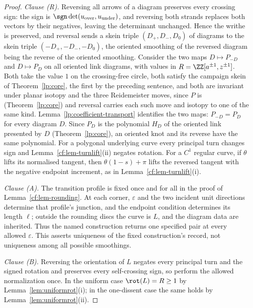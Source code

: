 \begin{proof}\leanok{}
\emph{Clause (R).}
Reversing all arrows of a diagram preserves every crossing sign: the sign
is $\sgn\det(u_{\mathrm{over}},u_{\mathrm{under}})$, and reversing both
strands replaces both vectors by their negatives, leaving the determinant
unchanged. Hence the writhe is preserved, and reversal sends a skein triple
$(D_+,D_-,D_0)$ of diagrams to the skein triple $(-D_+,-D_-,-D_0)$, the
oriented smoothing of the reversed diagram being the reverse of the
oriented smoothing. Consider the two maps $D\mapsto P_{-D}$ and
$D\mapsto P_D$ on all oriented link diagrams, with values in
$R=\ZZ[a^{\pm1},z^{\pm1}]$. Both take the value $1$ on the crossing-free
circle, both satisfy the campaign skein of Theorem~\ref{lp:core}, the
first by the preceding sentence, and both are invariant under planar
isotopy and the three Reidemeister moves, since $P$ is
(Theorem~\ref{lp:core}) and reversal carries each such move and isotopy
to one of the same kind. Lemma~\ref{lp:coefficient-transport} identifies
the two maps: $P_{-D}=P_D$ for every diagram $D$. Since $P_D$ is the
polynomial $H_D$ of the oriented link presented by $D$
(Theorem~\ref{lp:core}), an oriented knot and its reverse have the same
polynomial. For a polygonal underlying curve every principal turn changes
sign and Lemma~\ref{cf:lem-turnlift}(ii) negates rotation. For a $C^1$
regular curve, if $\theta$ lifts its normalised tangent, then
$\theta(1-s)+\pi$ lifts the reversed tangent with the negative endpoint
increment, as in Lemma~\ref{cf:lem-turnlift}(i).

\emph{Clause (A).} The transition profile is fixed once and for all in the proof of
Lemma~\ref{cf:lem-rounding}.  At each corner, $\varepsilon$ and the two incident
unit directions determine that profile's junction, and the endpoint condition
determines its length $\ell$; outside the rounding discs the curve is $L$, and
the diagram data are inherited.  Thus the named construction returns one
specified pair at every allowed $\varepsilon$.  This asserts uniqueness of the
fixed construction's record, not uniqueness among all possible smoothings.

\emph{Clause (B).}
Reversing the orientation of $L$ negates every principal turn and the signed rotation and
preserves every self-crossing sign, so perform the allowed normalization once. In the
uniform case $\rot(L)=R\geq1$ by Lemma~\ref{lem:uniformrot}(i); in the one-dissent case the same holds by Lemma~\ref{lem:uniformrot}(ii).


\end{proof}
